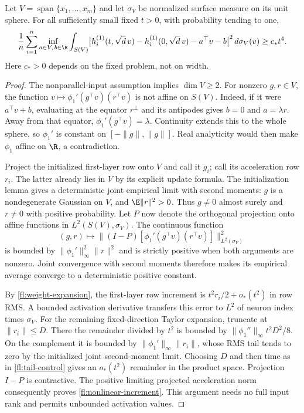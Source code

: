 \begin{lemma}
\label{fl:nonlinear-feature}
Let $V=\operatorname{span}\{x_1,\ldots,x_m\}$ and let $\sigma_V$ be
normalized surface measure on its unit sphere. For all sufficiently small
fixed $t>0$, with probability tending to one,
\begin{equation}
 \frac1n\sum_{i=1}^n\inf_{a\in V,\,b\in\R}
 \int_{S(V)}\bigl|h_i^{(1)}(t,\sqrt d\,v)-h_i^{(1)}(0,\sqrt d\,v)
                         -a^\top v-b\bigr|^2\,d\sigma_V(v)
 \ge c_*t^4.
 \label{fl:nonlinear-increment}
\end{equation}
Here $c_*>0$ depends on the fixed problem, not on width.
\end{lemma}

\begin{proof}
The nonparallel-input assumption implies $\dim V\ge2$. For nonzero
$g,r\in V$, the function
$v\mapsto\phi_1'(g^\top v)(r^\top v)$ is not affine on $S(V)$.
Indeed, if it were $a^\top v+b$, evaluating at the equator $r^\perp$
and its antipodes gives $b=0$ and $a=\lambda r$. Away from that equator,
$\phi_1'(g^\top v)=\lambda$. Continuity extends this to the whole
sphere, so $\phi_1'$ is constant on $[-\|g\|,\|g\|]$. Real analyticity
would then make $\phi_1$ affine on $\R$, a contradiction.

Project the initialized first-layer row onto $V$ and call it $g_i$;
call its acceleration row $r_i$. The latter already lies in $V$ by its
explicit update formula. The initialization lemma gives a deterministic
joint empirical limit with second moments: $g$ is a nondegenerate Gaussian
on $V$, and $\E\|r\|^2>0$. Thus $g\ne0$ almost surely and $r\ne0$
with positive probability. Let $P$ now denote the orthogonal projection
onto affine functions in $L^2(S(V),\sigma_V)$. The continuous function
\[
 (g,r)\longmapsto
 \|(I-P)[\phi_1'(g^\top v)(r^\top v)]\|_{L^2(\sigma_V)}^2
\]
is bounded by $\|\phi_1'\|_\infty^2\|r\|^2$ and is strictly positive
when both arguments are nonzero. Joint convergence with second moments
therefore makes its empirical average converge to a deterministic
positive constant.

By \eqref{fl:weight-expansion}, the first-layer row increment is
$t^2r_i/2+o_*(t^2)$ in row RMS. A bounded activation derivative transfers
this error to $L^2$ of neuron index times $\sigma_V$. For the remaining
fixed-direction Taylor expansion, truncate at $\|r_i\|\le D$.
There the remainder divided by $t^2$ is bounded by
$\|\phi_1''\|_\infty t^2D^2/8$. On the complement it is bounded
by $\|\phi_1'\|_\infty\|r_i\|$, whose RMS tail tends to zero by
the initialized joint second-moment limit. Choosing $D$ and then time
as in \eqref{fl:tail-control} gives an $o_*(t^2)$ remainder in the
product space. Projection $I-P$ is contractive. The positive limiting
projected acceleration norm consequently proves
\eqref{fl:nonlinear-increment}. This argument needs no full input rank
and permits unbounded activation values.
\end{proof}


